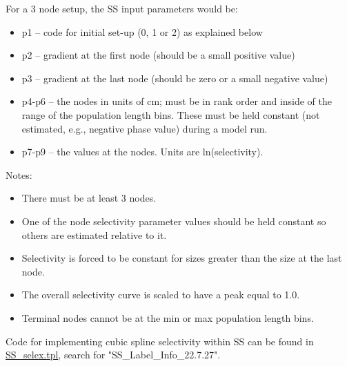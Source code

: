 For a 3 node setup, the SS input parameters would be:
	\begin{itemize}
		\item p1 – 	code for initial set-up (0, 1 or 2) as explained below
		\item p2 – 	gradient at the first node (should be a small positive value)
		\item p3 – 	gradient at the last node (should be zero or a small negative value)
		\item p4-p6 – the nodes in units of cm; must be in rank order and inside of the range of the population length bins.  These must be held constant (not estimated, e.g., negative phase value) during a model run.
		\item  p7-p9 – the values at the nodes. Units are ln(selectivity).
	\end{itemize}

Notes:
	\begin{itemize}
		\item There must be at least 3 nodes.
		\item One of the node selectivity parameter values should be held constant so others are estimated relative to it.
		\item Selectivity is forced to be constant for sizes greater than the size at the last node.
		\item The overall selectivity curve is scaled to have a peak equal to 1.0.
		\item Terminal nodes cannot be at the min or max population length bins.
	\end{itemize}
	
Code for implementing cubic spline selectivity within SS can be found in \href{https://github.com/nmfs-stock-synthesis/stock-synthesis/blob/main/SS_selex.tpl}{SS\_selex.tpl}, search for "SS\_Label\_Info\_22.7.27".



